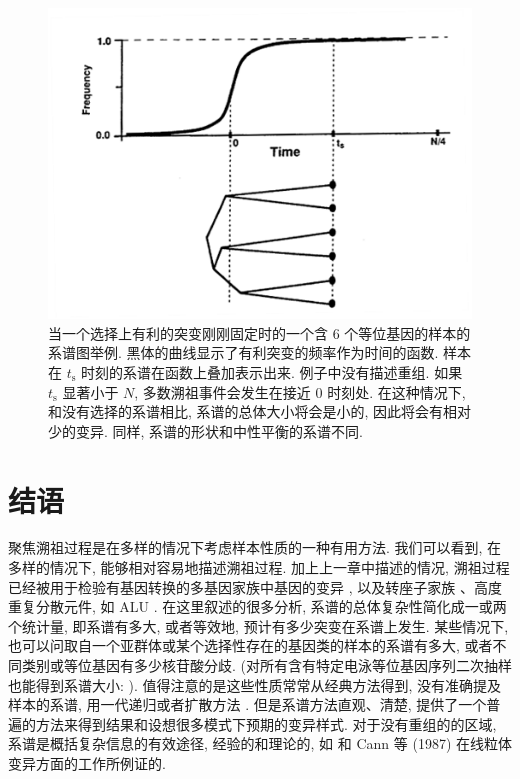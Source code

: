 \documentclass[12pt]{article}
\begin{document}
\begin{figure}
    \centering
    \includegraphics{coalescent-process.images/image10.png}
    \caption{
        当一个选择上有利的突变刚刚固定时的一个含 6 个等位基因的样本的系谱图举例.
        黑体的曲线显示了有利突变的频率作为时间的函数. 样本在 $t_{\text{s}}$
        时刻的系谱在函数上叠加表示出来. 例子中没有描述重组. 如果
        $t_{\text{s}}$ 显著小于 $N$, 多数溯祖事件会发生在接近 0 时刻处.
        在这种情况下, 和没有选择的系谱相比, 系谱的总体大小将会是小的,
        因此将会有相对少的变异. 同样, 系谱的形状和中性平衡的系谱不同.
    }
    \label{fig:10}
\end{figure}

\section{结语}

聚焦溯祖过程是在多样的情况下考虑样本性质的一种有用方法. 我们可以看到, 在多样的情况下, 能够相对容易地描述溯祖过程.
加上上一章中描述的情况, 溯祖过程已经被用于检验有基因转换的多基因家族中基因的变异 \parencite{kaplan1987, Watterson1989a},
以及转座子家族 \parencite{hudson1986}、高度重复分散元件, 如 ALU \parencite{kaplan1987}.
在这里叙述的很多分析, 系谱的总体复杂性简化成一或两个统计量, 即系谱有多大, 或者等效地, 预计有多少突变在系谱上发生.
某些情况下, 也可以问取自一个亚群体或某个选择性存在的基因类的样本的系谱有多大,
或者不同类别或等位基因有多少核苷酸分歧. (对所有含有特定电泳等位基因序列二次抽样也能得到系谱大小: \textcite{hudson1986a}).
值得注意的是这些性质常常从经典方法得到, 没有准确提及样本的系谱, 用一代递归或者扩散方法 \parencite{Watterson1989a}.
但是系谱方法直观、清楚, 提供了一个普遍的方法来得到结果和设想很多模式下预期的变异样式. 对于没有重组的的区域,
系谱是概括复杂信息的有效途径, 经验的和理论的, 如 \textcite{avise1987} 和 Cann 等 (1987) 在线粒体变异方面的工作所例证的.
\end{document}

